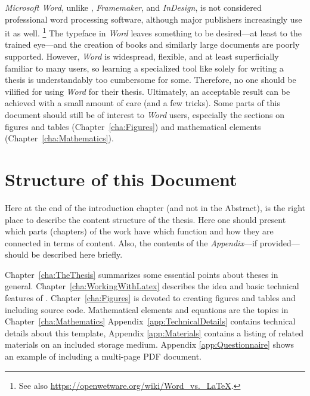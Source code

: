 \emph{Microsoft Word}, unlike \latex, \emph{Framemaker}, and \emph{InDesign},
is not considered professional word processing software, although major
publishers increasingly use it as well.%
\footnote{See also \url{https://openwetware.org/wiki/Word_vs._LaTeX}.}
The typeface in \emph{Word} leaves something to be desired---at least to the
trained eye---and the creation of books and similarly large documents are poorly
supported. However, \emph{Word} is widespread, flexible, and at least
superficially familiar to many users, so learning a specialized tool like \latex
solely for writing a thesis is understandably too cumbersome for some.
Therefore, no one should be vilified for using \emph{Word} for their thesis.
Ultimately, an acceptable result can be achieved with a small amount of care
(and a few tricks). Some parts of this document should still be of interest to
\emph{Word} users, especially the sections on figures and tables
(Chapter~\ref{cha:Figures}) and mathematical elements
(Chapter~\ref{cha:Mathematics}).


\section{Structure of this Document}

Here at the end of the introduction chapter (and not in the Abstract), is the
right place to describe the content structure of the thesis. Here one should
present which parts (chapters) of the work have which function and how they are
connected in terms of content. Also, the contents of the \emph{Appendix}---if
provided---should be described here briefly.

Chapter~\ref{cha:TheThesis} summarizes some essential points about theses in
general. Chapter~\ref{cha:WorkingWithLatex} describes the idea and basic
technical features of \latex. Chapter~\ref{cha:Figures} is devoted to creating
figures and tables and including source code. Mathematical elements and
equations are the topics in Chapter~\ref{cha:Mathematics} \etc
Appendix~\ref{app:TechnicalDetails} contains technical details about this
template, Appendix \ref{app:Materials} contains a listing of related materials
on an included storage medium. Appendix \ref{app:Questionnaire} shows an
example of including a multi-page PDF document.
